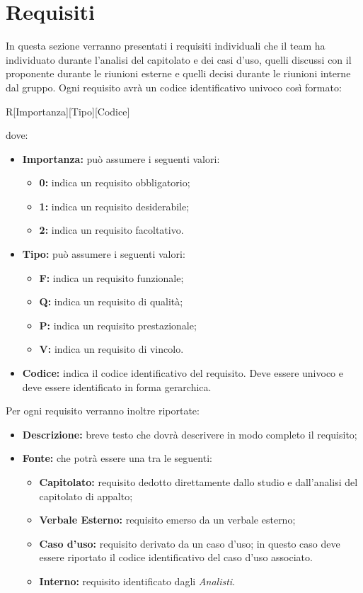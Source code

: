 \documentclass[../AnalisiDeiRequisiti.tex]{subfiles}
\begin{document}
	\section{Requisiti}
	In questa sezione verranno presentati i requisiti individuali che il team ha individuato durante l'analisi del capitolato e dei casi d'uso, quelli discussi con il proponente durante le riunioni esterne e quelli decisi durante le riunioni interne dal gruppo. 
	Ogni requisito avrà un codice identificativo univoco così formato:
	
	\begin{center} R[{Importanza}][{Tipo}][{Codice}] \end{center}
	
	dove:
	\begin{itemize}
		\item \textbf{Importanza:} può assumere i seguenti valori:
			\begin{itemize}
				\item \textbf{0:} indica un requisito obbligatorio;
				\item \textbf{1:} indica un requisito desiderabile;
				\item \textbf{2:} indica un requisito facoltativo.
			\end{itemize}
		
		\item \textbf{Tipo:} può assumere i seguenti valori:
			\begin{itemize}
				\item \textbf{F:} indica un requisito funzionale;
				\item \textbf{Q:} indica un requisito di qualità;
				\item \textbf{P:} indica un requisito prestazionale;
				\item \textbf{V:} indica un requisito di vincolo.
			\end{itemize}
			
		\item \textbf{Codice:} indica il codice identificativo del requisito. Deve essere univoco e deve essere identificato in forma gerarchica.
	\end{itemize}
	Per ogni requisito verranno inoltre riportate:
	\begin{itemize}
		\item \textbf{Descrizione:} breve testo che dovrà descrivere in modo completo il requisito;
		\item \textbf{Fonte:} che potrà essere una tra le seguenti:
		\begin{itemize}
			\item \textbf{Capitolato:} requisito dedotto direttamente dallo studio e dall'analisi del capitolato di appalto;
			\item \textbf{Verbale Esterno:} requisito emerso da un verbale esterno;
			\item \textbf{Caso d'uso:} requisito derivato  da un caso d'uso; in questo caso deve essere riportato il codice identificativo del caso d'uso associato.
			\item \textbf{Interno:} requisito identificato dagli \textit{Analisti}.
		\end{itemize}
	\end{itemize}
\end{document}
